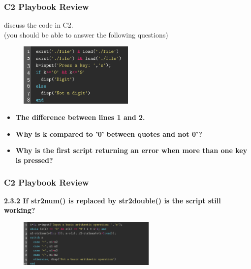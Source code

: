 \documentclass[
	11pt, %
]{beamer}
\begin{document}
\begin{frame}
    \frametitle{C2 Playbook Review}
    discuss the code in C2.\\(you should be able to answer the following questions)
    \begin{figure}
        \centering
        \includegraphics[width=0.5\textwidth]{c2_15.png}
    \end{figure}
    
    \begin{itemize}
        \item \textbf{The difference between lines 1 and 2.}
        \item \textbf{Why is k compared to '0' between quotes and not 0'?}
        \item \textbf{Why is the first script returning an error when more than one key is pressed?}
    \end{itemize}

\end{frame}


\begin{frame}
    \frametitle{C2 Playbook Review}
    \textbf{2.3.2 If str2num() is replaced by str2double() is the script still working?}
    \begin{figure}
        \centering
        \includegraphics[width=0.6\textwidth]{c2_18.png}
    \end{figure}


\end{frame}


\end{document}
